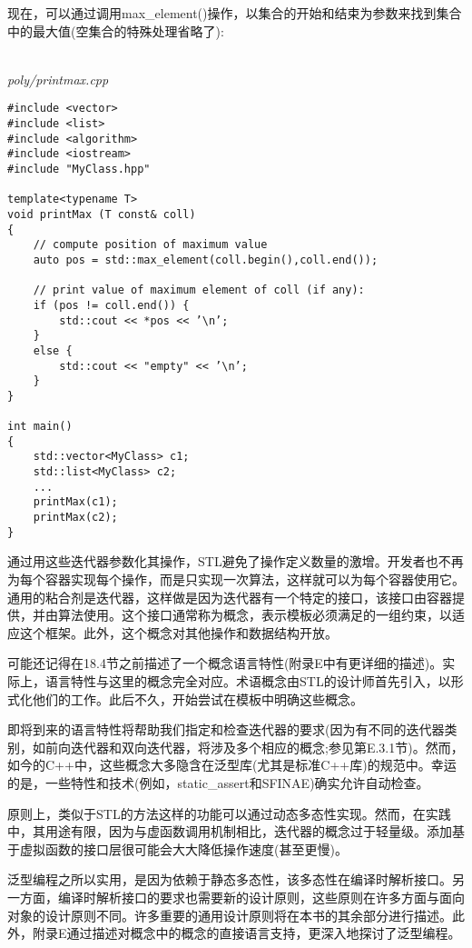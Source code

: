 现在，可以通过调用max\_element()操作，以集合的开始和结束为参数来找到集合中的最大值(空集合的特殊处理省略了):

\hspace*{\fill} \\ %
\noindent
\textit{poly/printmax.cpp}
\begin{lstlisting}[style=styleCXX]
#include <vector>
#include <list>
#include <algorithm>
#include <iostream>
#include "MyClass.hpp"

template<typename T>
void printMax (T const& coll)
{
	// compute position of maximum value
	auto pos = std::max_element(coll.begin(),coll.end());
	
	// print value of maximum element of coll (if any):
	if (pos != coll.end()) {
		std::cout << *pos << ’\n’;
	}
	else {
		std::cout << "empty" << ’\n’;
	}
}

int main()
{
	std::vector<MyClass> c1;
	std::list<MyClass> c2;
	...
	printMax(c1);
	printMax(c2);
}
\end{lstlisting}

通过用这些迭代器参数化其操作，STL避免了操作定义数量的激增。开发者也不再为每个容器实现每个操作，而是只实现一次算法，这样就可以为每个容器使用它。通用的粘合剂是迭代器，这样做是因为迭代器有一个特定的接口，该接口由容器提供，并由算法使用。这个接口通常称为概念，表示模板必须满足的一组约束，以适应这个框架。此外，这个概念对其他操作和数据结构开放。

可能还记得在18.4节之前描述了一个概念语言特性(附录E中有更详细的描述)。实际上，语言特性与这里的概念完全对应。术语概念由STL的设计师首先引入，以形式化他们的工作。此后不久，开始尝试在模板中明确这些概念。

即将到来的语言特性将帮助我们指定和检查迭代器的要求(因为有不同的迭代器类别，如前向迭代器和双向迭代器，将涉及多个相应的概念;参见第E.3.1节)。然而，如今的C++中，这些概念大多隐含在泛型库(尤其是标准C++库)的规范中。幸运的是，一些特性和技术(例如，static\_assert和SFINAE)确实允许自动检查。

原则上，类似于STL的方法这样的功能可以通过动态多态性实现。然而，在实践中，其用途有限，因为与虚函数调用机制相比，迭代器的概念过于轻量级。添加基于虚拟函数的接口层很可能会大大降低操作速度(甚至更慢)。

泛型编程之所以实用，是因为依赖于静态多态性，该多态性在编译时解析接口。另一方面，编译时解析接口的要求也需要新的设计原则，这些原则在许多方面与面向对象的设计原则不同。许多重要的通用设计原则将在本书的其余部分进行描述。此外，附录E通过描述对概念中的概念的直接语言支持，更深入地探讨了泛型编程。
























